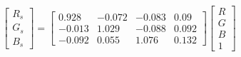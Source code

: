 \begin{equation}
\begin{bmatrix}
  R_s \\ G_s \\ B_s 
\end{bmatrix}=
\left[\begin{matrix}0.928 & -0.072 & -0.083 & 0.09\\ 
-0.013 & 1.029 & -0.088 & 0.092\\ 
-0.092 & 0.055 & 1.076 & 0.132\end{matrix}\right]
\begin{bmatrix}
  R \\ G \\ B \\ 1 
\end{bmatrix}
\end{equation}
